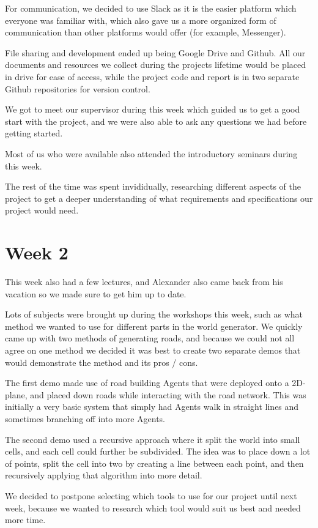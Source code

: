 \documentclass[11pt]{article}
\begin{document}
For communication, we decided to use Slack as it is the easier
platform which everyone was familiar with, which also gave us a more organized
form of communication than other platforms would offer (for example, Messenger).

File sharing and development ended up being Google Drive and Github. All our
documents and resources we collect during the projects lifetime would be placed
in drive for ease of access, while the project code and report is in two
separate Github repositories for version control.

We got to meet our supervisor during this week which guided us to get a good
start with the project, and we were also able to ask any questions we had before
getting started.

Most of us who were available also attended the introductory seminars during
this week.

The rest of the time was spent invididually, researching different aspects of
the project to get a deeper understanding of what requirements and
specifications our project would need.

\section*{Week 2}
\label{sec:orge6071e4}
This week also had a few lectures, and Alexander also came back from his
vacation so we made sure to get him up to date.

Lots of subjects were brought up during the workshops this week, such as what
method we wanted to use for different parts in the world generator.
We quickly came up with two methods of generating roads, and because we could
not all agree on one method we decided it was best to create two separate demos
that would demonstrate the method and its pros / cons.

The first demo made use of road building Agents that were deployed onto a
2D-plane, and placed down roads while interacting with the road network. This
was initially a very basic system that simply had Agents walk in straight lines
and sometimes branching off into more Agents.

The second demo used a recursive approach where it split the world into small
cells, and each cell could further be subdivided. The idea was to place down a
lot of points, split the cell into two by creating a line between each point,
and then recursively applying that algorithm into more detail.

We decided to postpone selecting which tools to use for our project until next
week, because we wanted to research which tool would suit us best and needed
more time.
\end{document}
